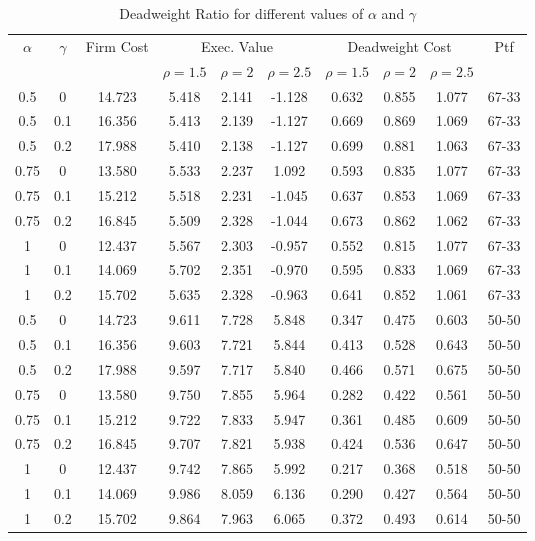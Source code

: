 \vspace*{10pt}

\begin{table}[H]
    \centering
    \begin{tabular}{cccccccccc}
        \hline
        \multirow{2}{*}{$\alpha$} & \multirow{2}{*}{$\gamma$} & \multirow{2}{*}{Firm Cost} & \multicolumn{3}{c}{Exec. Value} & \multicolumn{3}{c}{Deadweight Cost} & \multirow{2}{*}{Ptf}\\
        & & & $\rho = 1.5$ & $\rho = 2$ & $\rho = 2.5$ & $\rho = 1.5$ & $\rho = 2$ & $\rho = 2.5$ & \\
        \hline
        0.5 & 0 & 14.723 & 5.418 & 2.141 & -1.128 & 0.632 & 0.855 & 1.077 & 67-33 \\
        0.5 & 0.1 & 16.356 & 5.413 & 2.139 & -1.127 & 0.669 & 0.869 & 1.069 & 67-33 \\
        0.5 & 0.2 & 17.988 & 5.410 & 2.138 & -1.127 & 0.699 & 0.881 & 1.063 & 67-33 \\
        0.75 & 0 & 13.580 & 5.533 & 2.237 & 1.092 & 0.593 & 0.835 & 1.077 & 67-33 \\
        0.75 & 0.1 & 15.212 & 5.518 & 2.231 & -1.045 & 0.637 & 0.853 & 1.069 & 67-33 \\
        0.75 & 0.2 & 16.845 & 5.509 & 2.328 & -1.044 & 0.673 & 0.862 & 1.062 & 67-33 \\
        1 & 0 & 12.437 & 5.567 & 2.303 & -0.957 & 0.552 & 0.815 & 1.077 & 67-33 \\
        1 & 0.1 & 14.069 & 5.702 & 2.351 & -0.970 & 0.595 & 0.833 & 1.069 & 67-33 \\
        1 & 0.2 & 15.702 & 5.635 & 2.328 & -0.963 & 0.641 & 0.852 & 1.061 & 67-33 \\
        0.5 & 0 & 14.723 & 9.611 & 7.728 & 5.848 & 0.347 & 0.475 & 0.603 & 50-50 \\
        0.5 & 0.1 & 16.356 & 9.603 & 7.721 & 5.844 & 0.413 & 0.528 & 0.643 & 50-50 \\
        0.5 & 0.2 & 17.988 & 9.597 & 7.717 & 5.840 & 0.466 & 0.571 & 0.675 & 50-50 \\
        0.75 & 0 & 13.580 & 9.750 & 7.855 & 5.964 & 0.282 & 0.422 & 0.561 & 50-50 \\
        0.75 & 0.1 & 15.212 & 9.722 & 7.833 & 5.947 & 0.361 & 0.485 & 0.609 & 50-50 \\
        0.75 & 0.2 & 16.845 & 9.707 & 7.821 & 5.938 & 0.424 & 0.536 & 0.647 & 50-50 \\
        1 & 0 & 12.437 & 9.742 & 7.865 & 5.992 & 0.217 & 0.368 & 0.518 & 50-50 \\
        1 & 0.1 & 14.069 & 9.986 & 8.059 & 6.136 & 0.290 & 0.427 & 0.564 & 50-50 \\
        1 & 0.2 & 15.702 & 9.864 & 7.963 & 6.065 & 0.372 & 0.493 & 0.614 & 50-50 \\
        \hline
    
    \end{tabular}

    \caption{Deadweight Ratio for different values of $\alpha$ and $\gamma$}
    \label{tab:deadweight_ratio}
\end{table}

\vspace*{10pt}
    